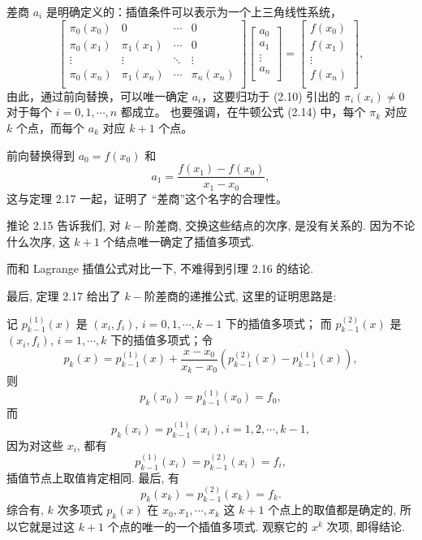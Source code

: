 \documentclass[a4paper]{ctexart}
\begin{document}
 差商 $a_i$ 是明确定义的：插值条件可以表示为一个上三角线性系统，
\[
\begin{bmatrix}
 \pi_0(x_0) & 0 & \cdots & 0 \\
 \pi_0(x_1) & \pi_1(x_1) & \cdots & 0 \\
 \vdots & \vdots & \ddots & \vdots \\
 \pi_0(x_n) & \pi_1(x_n) & \cdots & \pi_n(x_n) \\
\end{bmatrix} \begin{bmatrix}
 a_0 \\
 a_1 \\
 \vdots \\
 a_n \\
\end{bmatrix} = \begin{bmatrix}
 f (x_0) \\
 f (x_1) \\
 \vdots \\
 f (x_n) \\
\end{bmatrix},
\]
由此，通过前向替换，可以唯一确定 $a_i$，这要归功于 (2.10) 
引出的 $\pi_i(x_i) \neq 0$ 对于每个 $i = 0, 1, \cdots , n$ 都成立。
也要强调，在牛顿公式 (2.14) 中，每个 $\pi_k$ 对应 $k$ 个点，而每个 $a_k$ 对应 $k + 1$ 个点。

前向替换得到 $a_0 = f (x_0 )$ 和
\[
a_1 = \frac{f (x_1) - f (x_0)}{x_1 - x_0},
\]
这与定理 2.17 一起，证明了 ``差商''这个名字的合理性。

推论 2.15 告诉我们, 对 $k-$阶差商, 交换这些结点的次序, 是没有关系的. 因为不论什么次序,
这 $k + 1$ 个结点唯一确定了插值多项式.

而和 Lagrange 插值公式对比一下, 不难得到引理 2.16 的结论.

最后, 定理 2.17 给出了 $k-$阶差商的递推公式, 这里的证明思路是:

记 $p_{k - 1}^{(1)}(x)$ 是 $(x_i, f_i)$, $i = 0, 1, \cdots, k - 1$ 下的插值多项式；
而 $p_{k - 1}^{(2)}(x)$ 是 $(x_i, f_i)$, $i = 1, \cdots, k$ 下的插值多项式；令
$$
p_k(x) = p_{k - 1}^{(1)}(x)
+ \frac{x - x_0}{x_k - x_0}\left(p_{k - 1}^{(2)}(x) - p_{k - 1}^{(1)}(x)\right),
$$
则
$$
p_k(x_0) = p_{k - 1}^{(1)}(x_0) = f_0,
$$
而
$$
p_k(x_i) = p_{k - 1}^{(1)}(x_i), i = 1, 2, \cdots, k - 1,
$$
因为对这些 $x_i$, 都有
$$
p_{k - 1}^{(1)}(x_i) = p_{k - 1}^{(2)}(x_i) = f_i,
$$
插值节点上取值肯定相同. 最后, 有
$$
p_k(x_k) = p_{k - 1}^{(2)}(x_k) = f_k.
$$
综合有, $k$ 次多项式 $p_k(x)$ 在 $x_0, x_1, \cdots, x_k$ 这 $k + 1$
个点上的取值都是确定的, 所以它就是过这 $k + 1$ 个点的唯一的一个插值多项式. 观察它的 $x^k$ 次项,
即得结论.
\end{document}
